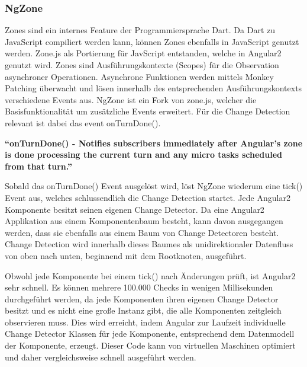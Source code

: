 \subsubsection{NgZone}

Zones sind ein internes Feature der Programmiersprache Dart. Da Dart zu JavaScript compiliert werden kann,
können Zones ebenfalls in JavaScript genutzt werden. Zone.js als Portierung für JavScript entstanden, welche in Angular2 genutzt wird.
Zones sind Ausführungskontexte (Scopes) für die Observation asynchroner Operationen.
Asynchrone Funktionen werden mittels Monkey Patching überwacht und lösen innerhalb des entsprechenden Ausführungskontexts verschiedene Events aus.
NgZone ist ein Fork von zone.js, welcher die Basisfunktionalität um zusätzliche Events erweitert.
Für die Change Detection relevant ist dabei das event onTurnDone().
\cite{changedetection-explained}

\vspace{0.5cm}
\textbf{``onTurnDone() - Notifies subscribers immediately after Angular’s zone is done processing the current turn and any micro tasks scheduled from that turn.''}
\cite{ZONESINANGULAR2}
\vspace{0.5cm}

Sobald das onTurnDone() Event ausgelöst wird, löst NgZone wiederum eine tick() Event aus, welches schlussendlich die Change Detection startet.
Jede Angular2 Komponente besitzt seinen eigenen Change Detector. Da eine Angular2 Applikation aus einem Komponentenbaum besteht,
kann davon ausgegangen werden, dass sie ebenfalls aus einem Baum von Change Detectoren besteht.
Change Detection wird innerhalb dieses Baumes als unidirektionaler Datenfluss von oben nach unten, beginnend mit dem Rootknoten, ausgeführt.

Obwohl jede Komponente bei einem tick() nach Änderungen prüft, ist Angular2 sehr schnell. Es können mehrere 100.000 Checks in wenigen Millisekunden durchgeführt werden,
da jede Komponenten ihren eigenen Change Detector besitzt und es nicht eine große Instanz gibt, die alle Komponenten zeitgleich observieren muss.
Dies wird erreicht, indem Angular zur Laufzeit individuelle Change Detector Klassen für jede Komponente, entsprechend dem Datenmodell der Komponente, erzeugt.
Dieser Code kann von virtuellen Maschinen optimiert und daher vergleichsweise schnell ausgeführt werden.

\vspace{1cm}

